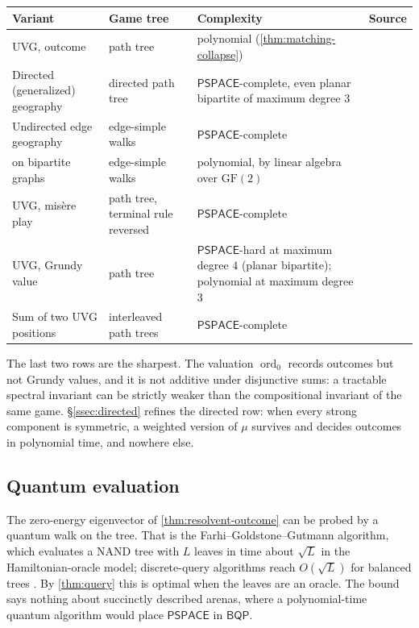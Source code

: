 \documentclass[11pt]{amsart}
\theoremstyle{plain}
\theoremstyle{definition}
\theoremstyle{remark}
\numberwithin{equation}{section}
\newcommand{\ord}{\operatorname{ord}}
\newcommand{\cls}[1]{\mathsf{#1}}
\newcommand{\PSPACE}{\cls{PSPACE}}
\newcommand{\BQP}{\cls{BQP}}
\begin{document}
\begin{center}
\begin{tabularx}{\linewidth}{@{}L{0.24}L{0.2}>{\raggedright\arraybackslash}X L{0.19}@{}}
\toprule
Variant & Game tree & Complexity & Source\\ \midrule
UVG, outcome & path tree & polynomial (\cref{thm:matching-collapse}) & \cite{FSU}\\
Directed (generalized) geography & directed path tree & $\PSPACE$-complete, even planar bipartite of maximum degree $3$ & \cite{LichtensteinSipser}\\
Undirected edge geography & edge-simple walks & $\PSPACE$-complete & \cite{FSU}\\
\quad on bipartite graphs & edge-simple walks & polynomial, by linear algebra over $\mathrm{GF}(2)$ & \cite{FSU}\\
UVG, mis\`ere play & path tree, terminal rule reversed & $\PSPACE$-complete & \cite{RenaultSchmidt}\\
UVG, Grundy value & path tree & $\PSPACE$-hard at maximum degree $4$ (planar bipartite); polynomial at maximum degree $3$ & \cite{BFT}\\
Sum of two UVG positions & interleaved path trees & $\PSPACE$-complete & \cite{BFT}\\
\bottomrule
\end{tabularx}
\end{center}

The last two rows are the sharpest. The valuation $\ord_0$ records outcomes but not Grundy values, and it is not additive under disjunctive sums: a tractable spectral invariant can be strictly weaker than the compositional invariant of the same game. \S\ref{ssec:directed} refines the directed row: when every strong component is symmetric, a weighted version of $\mu$ survives and decides outcomes in polynomial time, and nowhere else.

\subsection{Quantum evaluation}
The zero-energy eigenvector of \cref{thm:resolvent-outcome} can be probed by a quantum walk on the tree. That is the Farhi--Goldstone--Gutmann algorithm, which evaluates a NAND tree with $L$ leaves in time about $\sqrt L$ in the Hamiltonian-oracle model; discrete-query algorithms reach $O(\sqrt L)$ for balanced trees \cite{ACRSZ}. By \cref{thm:query} this is optimal when the leaves are an oracle. The bound says nothing about succinctly described arenas, where a polynomial-time quantum algorithm would place $\PSPACE$ in $\BQP$.
\end{document}
